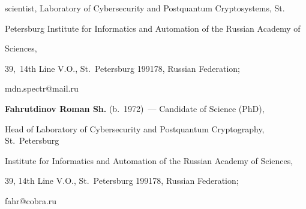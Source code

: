 scientist, Laboratory of  Cybersecurity and Postquantum Cryptosystems, St. 


Petersburg Institute for Informatics and Automation of the Russian Academy of 


Sciences, 


  39,~14th Line V.O., St.\ Petersburg 199178, Russian Federation; 


\mbox{mdn.spectr@mail.ru}


  \vspace*{3pt}


  


  \noindent


  \textbf{Fahrutdinov Roman Sh.} (b.\ 1972)~--- Candidate of Science (PhD), 


Head of Laboratory of Cybersecurity and Postquantum Cryptography, St.\ Petersburg 


Institute for Informatics and Automation of the Russian Academy of Sciences, 


  39, 14th Line V.O., St.\ Petersburg 199178, Russian Federation; 


\mbox{fahr@cobra.ru}


  











\label{end\stat}





\renewcommand{\bibname}{\protect\rm Литература} 


  


